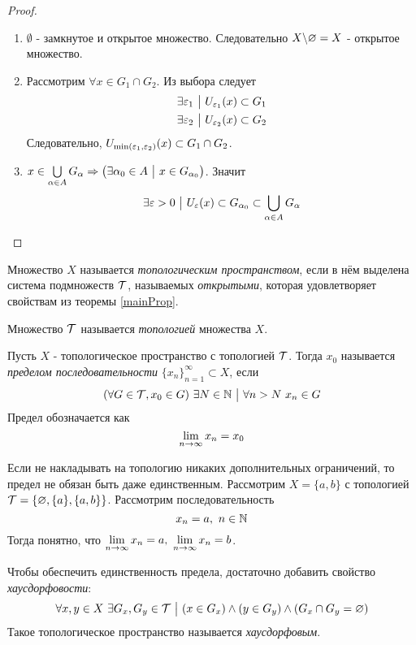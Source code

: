 \begin{proof}~
	\begin{enumerate}
		\item $\emptyset$ - замкнутое и открытое множество. Следовательно $X \backslash \varnothing = X$ - открытое множество.
		
		\item Рассмотрим $\forall x \in G_1 \cap G_2$. Из выбора следует
		\begin{align*}
			&\exists \varepsilon_1 \ \big|\  U_{\varepsilon_1}(x) \subset G_1
			\\
			&\exists \varepsilon_2 \ \big|\  U_{\varepsilon_2}(x) \subset G_2 
		\end{align*}
		Следовательно, $U_{\min(\varepsilon_1, \varepsilon_2)}(x) \subset G_1 \cap G_2$.
		
		\item $x \in \bigcup\limits_{\alpha \in A} G_\alpha \Rightarrow \left(\exists \alpha_0 \in A \ \big|\  x \in G_{\alpha_0}\right)$. Значит
		\[
			\exists \varepsilon > 0 \ \big|\  U_\varepsilon(x) \subset G_{\alpha_0} \subset \bigcup\limits_{\alpha \in A} G_{\alpha}
		\]
	\end{enumerate}
\end{proof}

\begin{definition}
	Множество $X$ называется \textit{топологическим пространством}, если в нём выделена система подмножеств $\mathcal{T}$, называемых \textit{открытыми}, которая удовлетворяет свойствам из теоремы \ref{mainProp}.
	
	Множество $\mathcal{T}$ называется \textit{топологией} множества $X$.
\end{definition}

\begin{definition}
	Пусть $X$ - топологическое пространство с топологией $\mathcal{T}$. Тогда $x_0$ называется \textit{пределом последовательности} $\{x_n\}_{n = 1}^\infty \subset X$, если
	\[
		(\forall G \in \Tau, x_0 \in G)\ \exists N \in \N \such \forall n > N\ x_n \in G
	\]
	Предел обозначается как
	\[
		\lim\limits_{n \to \infty} x_n = x_0
	\]
\end{definition}

\begin{example}
	Если не накладывать на топологию никаких дополнительных ограничений, то предел не обязан быть даже единственным. Рассмотрим $X = \{a, b\}$ с топологией $\mathcal{T} = \{\varnothing, \{a\}, \{a, b\}\}$. Рассмотрим последовательность
	\[
		x_n = a,\ n \in \mathbb{N}
	\]
	Тогда понятно, что $\lim\limits_{n \to \infty} x_n = a,\ \lim\limits_{n \to \infty} x_n = b$.
\end{example}

\begin{anote}
	Чтобы обеспечить единственность предела, достаточно добавить свойство \textit{хаусдорфовости}:
	\[
		\forall x, y \in X\ \exists G_x, G_y \in \mathcal{T} \ \big|\  (x \in G_x) \wedge (y \in G_y) \wedge (G_x \cap G_y = \varnothing)
	\]
	Такое топологическое пространство называется \textit{хаусдорфовым}.
\end{anote}